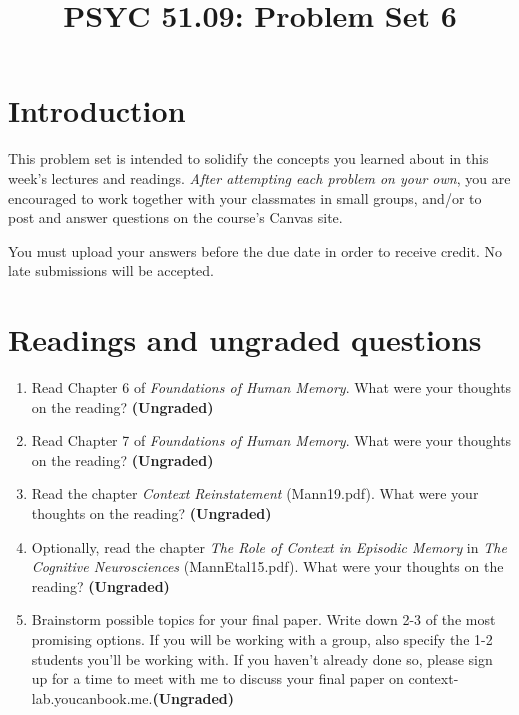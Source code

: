 \documentclass[11pt]{article}
\title{PSYC 51.09: Problem Set 6}
\date{}
\begin{document}
\maketitle
\vspace{-0.75in}
\section*{Introduction}
This problem set is intended to solidify the concepts you learned
about in this week's lectures and readings.  \textit{After attempting each problem on your own}, you are
encouraged to work together with your classmates in small groups,
and/or to post and answer questions on the course’s Canvas site.

You must upload your answers before the due date in order to receive credit.  No late submissions will be accepted.

\section*{Readings and ungraded questions}
\begin{enumerate}
\item Read Chapter 6 of \textit{Foundations of Human Memory}.  What were your thoughts on the reading?
  \textbf{(Ungraded)}

\item Read Chapter 7 of \textit{Foundations of Human Memory}.  What were your thoughts on the reading?
  \textbf{(Ungraded)}

\item Read the chapter \textit{Context Reinstatement} (Mann19.pdf).  What were your thoughts on the reading?
  \textbf{(Ungraded)}

\item Optionally, read the chapter \textit{The Role of Context in
    Episodic Memory} in \textit{The Cognitive Neurosciences}
  (MannEtal15.pdf).  What were your thoughts on the reading?
  \textbf{(Ungraded)}


\item Brainstorm possible topics for your final paper.  Write down 2-3
  of the most promising options.  If you will be working with a group,
  also specify the 1-2 students you'll be working with. If you haven't
  already done so, please sign up for a time to meet with me to
  discuss your final paper on context-lab.youcanbook.me.\textbf{(Ungraded)}
\end{enumerate}
\end{document}
